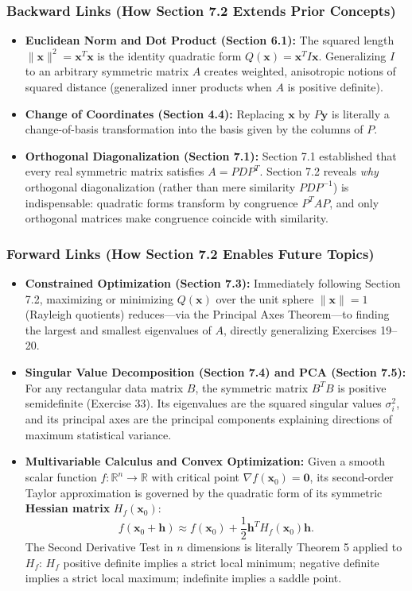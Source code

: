 \documentclass[11pt, letterpaper]{article}
\theoremstyle{definition}
\theoremstyle{remark}
\begin{document}
\subsubsection*{Backward Links (How Section 7.2 Extends Prior Concepts)}
\begin{itemize}
    \item \textbf{Euclidean Norm and Dot Product (Section 6.1):} The squared length $\|\mathbf{x}\|^2 = \mathbf{x}^T \mathbf{x}$ is the identity quadratic form $Q(\mathbf{x}) = \mathbf{x}^T I \mathbf{x}$. Generalizing $I$ to an arbitrary symmetric matrix $A$ creates weighted, anisotropic notions of squared distance (generalized inner products when $A$ is positive definite).
    \item \textbf{Change of Coordinates (Section 4.4):} Replacing $\mathbf{x}$ by $P\mathbf{y}$ is literally a change-of-basis transformation into the basis given by the columns of $P$.
    \item \textbf{Orthogonal Diagonalization (Section 7.1):} Section 7.1 established that every real symmetric matrix satisfies $A = P D P^T$. Section 7.2 reveals \emph{why} orthogonal diagonalization (rather than mere similarity $P D P^{-1}$) is indispensable: quadratic forms transform by congruence $P^T A P$, and only orthogonal matrices make congruence coincide with similarity.
\end{itemize}

\subsubsection*{Forward Links (How Section 7.2 Enables Future Topics)}
\begin{itemize}
    \item \textbf{Constrained Optimization (Section 7.3):} Immediately following Section 7.2, maximizing or minimizing $Q(\mathbf{x})$ over the unit sphere $\|\mathbf{x}\| = 1$ (Rayleigh quotients) reduces—via the Principal Axes Theorem—to finding the largest and smallest eigenvalues of $A$, directly generalizing Exercises 19--20.
    \item \textbf{Singular Value Decomposition (Section 7.4) and PCA (Section 7.5):} For any rectangular data matrix $B$, the symmetric matrix $B^T B$ is positive semidefinite (Exercise 33). Its eigenvalues are the squared singular values $\sigma_i^2$, and its principal axes are the principal components explaining directions of maximum statistical variance.
    \item \textbf{Multivariable Calculus and Convex Optimization:} Given a smooth scalar function $f : \mathbb{R}^n \to \mathbb{R}$ with critical point $\nabla f(\mathbf{x}_0) = \mathbf{0}$, its second-order Taylor approximation is governed by the quadratic form of its symmetric \textbf{Hessian matrix} $H_f(\mathbf{x}_0)$:
    \[
    f(\mathbf{x}_0 + \mathbf{h}) \approx f(\mathbf{x}_0) + \frac{1}{2} \mathbf{h}^T H_f(\mathbf{x}_0) \mathbf{h}.
    \]
    The Second Derivative Test in $n$ dimensions is literally Theorem 5 applied to $H_f$: $H_f$ positive definite implies a strict local minimum; negative definite implies a strict local maximum; indefinite implies a saddle point.
\end{itemize}
\end{document}
